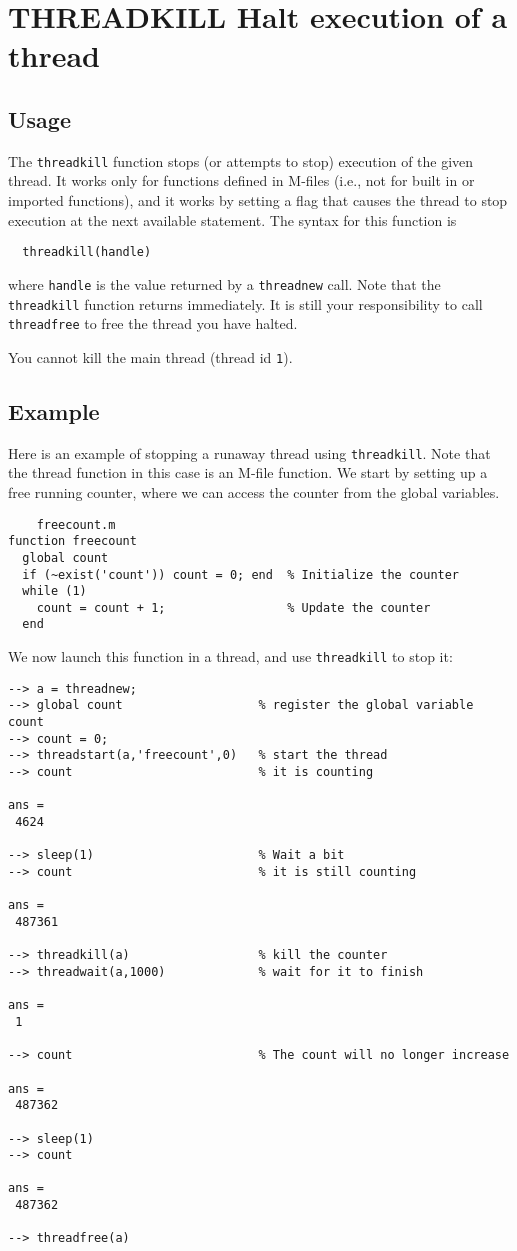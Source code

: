 \section{THREADKILL Halt execution of a thread}

\subsection{Usage}

The \verb|threadkill| function stops (or attempts to stop) execution
of the given thread.  It works only for functions defined in M-files
(i.e., not for built in or imported functions), and it works by 
setting a flag that causes the thread to stop execution at the next
available statement.  The syntax for this function is 
\begin{verbatim}
  threadkill(handle)
\end{verbatim}
where \verb|handle| is the value returned by a \verb|threadnew| call.  
Note that the \verb|threadkill| function returns immediately.  It 
is still your responsibility to call \verb|threadfree| to free
the thread you have halted.

You cannot kill the main thread (thread id \verb|1|).
\subsection{Example}

Here is an example of stopping a runaway thread using \verb|threadkill|.
Note that the thread function in this case is an M-file function.
We start by setting up a free running counter, where we can access 
the counter from the global variables.  
\begin{verbatim}
    freecount.m
function freecount
  global count
  if (~exist('count')) count = 0; end  % Initialize the counter
  while (1)
    count = count + 1;                 % Update the counter
  end
\end{verbatim}
We now launch this function in a thread, and use \verb|threadkill| to
stop it:
\begin{verbatim}
--> a = threadnew;
--> global count                   % register the global variable count
--> count = 0;
--> threadstart(a,'freecount',0)   % start the thread
--> count                          % it is counting

ans = 
 4624 

--> sleep(1)                       % Wait a bit
--> count                          % it is still counting

ans = 
 487361 

--> threadkill(a)                  % kill the counter
--> threadwait(a,1000)             % wait for it to finish

ans = 
 1 

--> count                          % The count will no longer increase

ans = 
 487362 

--> sleep(1)
--> count

ans = 
 487362 

--> threadfree(a)
\end{verbatim}
